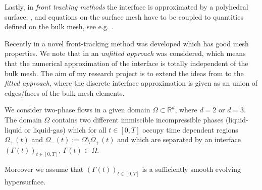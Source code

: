 \documentclass[a4paper,11pt, onecolumn]{article}
\newcommand{\cor}[1]{\textit{#1}} %
\begin{document}
Lastly, in \cor{front tracking methods} the interface is approximated
by a polyhedral surface, \cite{DeckelnickDE05}, and equations on the surface
mesh have to be coupled to quantities defined on the bulk mesh, see e.g.
\cite{UnverdiT92,Bansch01,Tryggvason_etal01,GanesanMT07}.
\newline

Recently in \cite{spurious,fluidfbp} a novel front-tracking method was
developed which has good mesh properties. We note that in
\cite{spurious,fluidfbp} an \cor{unfitted approach} was considered, which means
that the numerical approximation of the interface is totally independent of the
bulk mesh. The aim of my research project is to extend the ideas from
\cite{spurious,fluidfbp} to the \cor{fitted approach}, where the discrete
interface approximation is given as an union of edges/faces of the bulk mesh
elements.
\newline

We consider two-phase flows in a given domain
$\Omega\subset\mathbb{R}^d$, where $d=2$ or $d=3$. The domain $\Omega$ contains
two different immiscible incompressible phases (liquid-liquid or liquid-gas)
which for all $t\in[0,T]$ occupy time dependent regions $\Omega_+(t)$ and
$\Omega_-(t):=\Omega\setminus\overline{\Omega}_+(t)$ and which are separated by
an interface $(\Gamma(t))_{t\in[0,T]}$, $\Gamma(t)\subset\Omega$.

Moreover we assume that $(\Gamma(t))_{t\in [0,T]}$ is a sufficiently
smooth evolving hypersurface.
\newline
\end{document}
